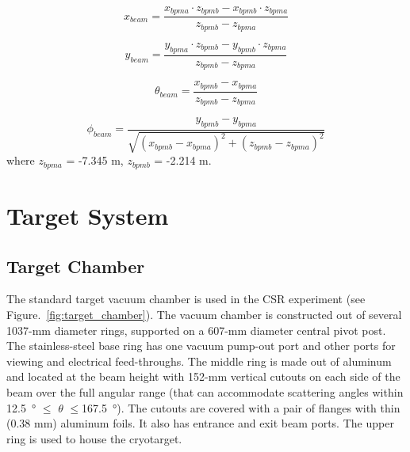 \begin{equation}
x_{beam} = \frac{x_{bpma} \cdot z_{bpmb} - x_{bpmb} \cdot z_{bpma}}{z_{bpmb}-z_{bpma}}
\end{equation}

\begin{equation}
y_{beam} = \frac{y_{bpma} \cdot z_{bpmb} - y_{bpmb} \cdot z_{bpma}}{z_{bpmb}-z_{bpma}}
\end{equation}

\begin{equation}
\theta_{beam} = \frac{x_{bpmb} - x_{bpma} }{z_{bpmb}-z_{bpma}}
\end{equation}

\begin{equation}
\phi_{beam} = \frac{y_{bpmb} - y_{bpma} }{\sqrt{(x_{bpmb} - x_{bpma})^2+(z_{bpmb}-z_{bpma})^2 }}
\end{equation}
where $z_{bpma}$ = -7.345 m, $z_{bpmb}$ = -2.214 m.  



\section{Target System}

\subsection{Target Chamber}
The standard target vacuum chamber is used in the CSR experiment (see Figure.~\ref{fig:target_chamber}). The vacuum chamber is constructed out of several 1037-mm diameter rings, supported on a 607-mm diameter central pivot post. 
The stainless-steel base ring has one vacuum pump-out port and other ports for viewing and electrical feed-throughs. The
middle ring is made out of aluminum and located at the beam
height with 152-mm vertical cutouts on each side of the beam over the full angular range (that can accommodate
scattering angles within \SI{12.5}{\degree} $\leq$ $\theta$
$\leq$\SI{167.5}{\degree}). The cutouts are covered with
a pair of flanges with thin (0.38 mm) aluminum foils. It also has entrance and exit beam ports. The upper ring is used to house the cryotarget.

